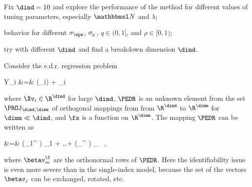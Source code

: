 {\color{blue} 
\begin{mylist}
\item
Fix \( \dimd = 10 \) and explore the performance of the method 
for different values of tuning parameters, especially \( \nmin \) and \( \lambda \);

\item
behavior for different \( \sigma_{\eps} \), \( \sigma_{\!_{X}} \), \( q \in (0,1] \), and \( \rho \in [0,1) \);

\item
try with different \( \dimd \) and find a breakdown dimension \( \dimd \).

\end{mylist}
 
}



\label{Smultind}


Consider the e.d.r. regression problem
\begin{EQA}
	Y_{i}
	&=&
	\fs(\PEDR \Xv_{i}) + \eps_{i}
\label{YifXieiedr}
\end{EQA}
where \( \Xv_{i} \in \R^{\dimd} \) for large \( \dimd \), 
\( \PEDR \) is an unknown element from the set \( \PROJ_{\dimd,\dimm} \) 
of orthogonal mappings from 
from \( \R^{\dimd} \) to \( \R^{\dimm} \) for \( \dimm \ll \dimd \), and
\( \fs \) is a function on \( \R^{\dimm} \).
The mapping \( \PEDR \) can be written as 
\begin{EQA}
	\PEDR \xv
	&=&
	(\betav_{1}^{\T} \xv) \betav_{1} + \ldots + (\betav_{\dimm}^{\T} \xv) \betav_{\dimm}
	\, ,
\label{ydgenb8jejohkou90tkr}
\end{EQA}
where \( \betav_{m}^{\T} \) are the orthonormal rows of \( \PEDR \).
Here the identifiability issue is even more severe than in the single-index model, because 
the set of the vectors \( \betav_{j} \) can be exchanged, rotated, etc. 


